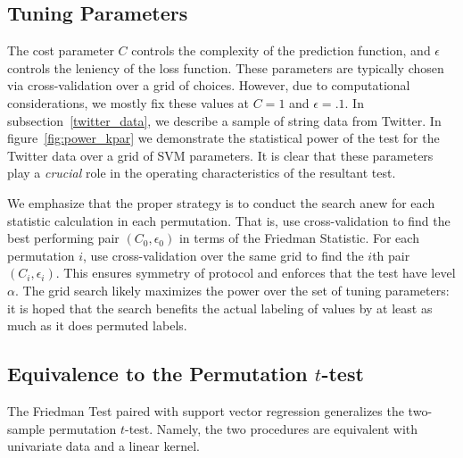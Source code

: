 \subsection{Tuning Parameters}
The cost parameter $C$ controls the complexity of the
prediction function, and $\epsilon$ controls the leniency of the loss
function.  These parameters are typically chosen via cross-validation
over a grid of choices.  However, due to computational considerations,
we mostly fix these values at $C = 1$ and $\epsilon = .1$.  In
subsection~\ref{twitter_data}, we describe a sample of string data
from Twitter.  In figure~\ref{fig:power_kpar} we demonstrate the
statistical power of the test for the Twitter data over a grid of SVM
parameters.  It is clear that these parameters play a \emph{crucial}
role in the operating characteristics of the resultant test.  

We emphasize that the proper strategy is to conduct the search anew
for each statistic calculation in each permutation.  That is, use cross-validation to
find the best performing pair $(C_0, \epsilon_0)$ in terms of the
Friedman Statistic.  For each permutation $i$, use cross-validation
over the same grid to find the $i$th pair $(C_i, \epsilon_i)$.  This
ensures symmetry of protocol and enforces that the test have level
$\alpha$.  The grid search likely maximizes the power over the set of
tuning parameters: it is hoped that the search benefits the actual
labeling of values by at least as much as it does permuted labels.

\subsection{Equivalence to the Permutation $t$-test}
\begin{theorem}
  \label{friedman_equiv}
  The Friedman Test paired with support vector regression generalizes
  the two-sample permutation $t$-test. Namely, the two procedures are
  equivalent with univariate data and a linear kernel.
\end{theorem}

